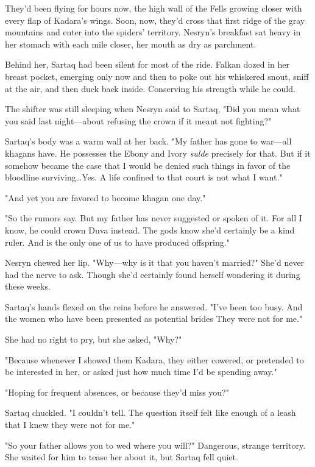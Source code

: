 They'd been flying for hours now, the high wall of the Fells growing closer with every flap of Kadara's wings.
Soon, now, they'd cross that first ridge of the gray mountains and enter into the spiders' territory.
Nesryn's breakfast sat heavy in her stomach with each mile closer, her mouth as dry as parchment.

Behind her, Sartaq had been silent for most of the ride.
Falkan dozed in her breast pocket, emerging only now and then to poke out his whiskered snout, sniff at the air, and then duck back inside.
Conserving his strength while he could.

The shifter was still sleeping when Nesryn said to Sartaq, "Did you mean what you said last night---about refusing the crown if it meant not fighting?"

Sartaq's body was a warm wall at her back.
"My father has gone to war---all khagans have.
He possesses the Ebony and Ivory \emph{sulde}
precisely for that.
But if it somehow became the case that I would be denied such things in favor of the bloodline surviving\ldots Yes.
A life confined to that court is not what I want."

"And yet you are favored to become khagan one day."

"So the rumors say.
But my father has never suggested or spoken of it.
For all I know, he could crown Duva instead.
The gods know she'd certainly be a kind ruler.
And is the only one of us to have produced offspring."

Nesryn chewed her lip.
"Why---why is it that you haven't married?"
She'd never had the nerve to ask.
Though she'd certainly found herself wondering it during these weeks.

Sartaq's hands flexed on the reins before he answered.
"I've been too busy.
And the women who have been presented as potential brides 
They were not for me."

She had no right to pry, but she asked, "Why?"

"Because whenever I showed them Kadara, they either cowered, or pretended to be interested in her, or asked just how much time I'd be spending away."

"Hoping for frequent absences, or because they'd miss you?"

Sartaq chuckled.
"I couldn't tell.
The question itself felt like enough of a leash that I knew they were not for me."

"So your father allows you to wed where you will?"
Dangerous, strange territory.
She waited for him to tease her about it, but Sartaq fell quiet.


